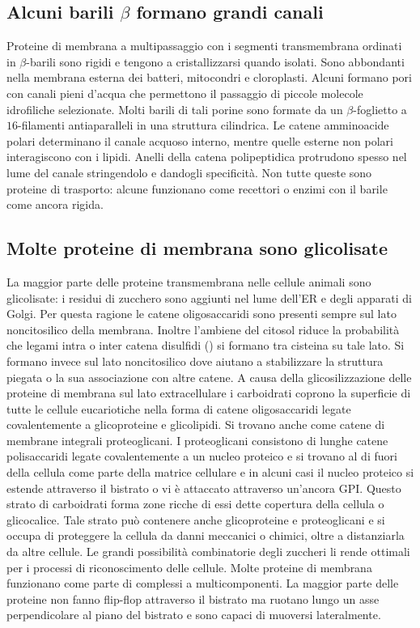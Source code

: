 \subsection{Alcuni barili $\beta$ formano grandi canali}
Proteine di membrana a multipassaggio con i segmenti transmembrana ordinati in $\beta$-barili sono rigidi e tengono a cristallizzarsi quando isolati. Sono abbondanti nella membrana 
esterna dei batteri, mitocondri e cloroplasti. Alcuni formano pori con canali pieni d'acqua che permettono il passaggio di piccole molecole idrofiliche selezionate. Molti barili di tali
porine sono formate da un $\beta$-foglietto a $16$-filamenti antiaparalleli in una struttura cilindrica. Le catene amminoacide polari determinano il canale acquoso interno, mentre quelle
esterne non polari interagiscono con i lipidi. Anelli della catena polipeptidica protrudono spesso nel lume del canale stringendolo e dandogli specificit\`a. Non tutte queste sono
proteine di trasporto: alcune funzionano come recettori o enzimi con il barile come ancora rigida. 
\subsection{Molte proteine di membrana sono glicolisate}
La maggior parte delle proteine transmembrana nelle cellule animali sono glicolisate: i residui di zucchero sono aggiunti nel lume dell'ER e degli apparati di Golgi. Per questa ragione
le catene oligosaccaridi sono presenti sempre sul lato noncitosilico della membrana. Inoltre l'ambiene del citosol riduce la probabilit\`a che legami intra o inter catena disulfidi 
() si formano tra cisteina su tale lato. Si formano invece sul lato noncitosilico dove aiutano a stabilizzare la struttura piegata o la sua associazione con altre catene. A 
causa della glicosilizzazione delle proteine di membrana sul lato extracellulare i carboidrati coprono la superficie di tutte le cellule eucariotiche nella forma di catene oligosaccaridi
legate covalentemente a glicoproteine e glicolipidi. Si trovano anche come catene di membrane integrali proteoglicani. I proteoglicani consistono di lunghe catene polisaccaridi legate
covalentemente a un nucleo proteico e si trovano al di fuori della cellula come parte della matrice cellulare e in alcuni casi il nucleo proteico si estende attraverso il bistrato o vi
\`e attaccato attraverso un'ancora GPI. Questo strato di carboidrati forma zone ricche di essi dette copertura della cellula o glicocalice. Tale strato pu\`o contenere anche glicoproteine
e proteoglicani e si occupa di proteggere la cellula da danni meccanici o chimici, oltre a distanziarla da altre cellule. Le grandi possibilit\`a combinatorie degli zuccheri li rende
ottimali per i processi di riconoscimento delle cellule. Molte proteine di membrana funzionano come parte di complessi a multicomponenti. La maggior parte delle proteine non fanno 
flip-flop attraverso il bistrato ma ruotano lungo un asse perpendicolare al piano del bistrato e sono capaci di muoversi lateralmente.
